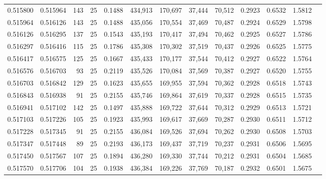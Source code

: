 \begin{tabular}{rrrrrrrrrrrrr}
0.515800 & 0.515964 &   143 &  25 &                                     0.1488 & 434,913 & 170,697 &  37,444 &  70,512 & 0.2923 & 0.6532 & 1.5812 \\
0.515964 & 0.516126 &   143 &  25 &                                     0.1488 & 435,056 & 170,554 &  37,469 &  70,487 & 0.2924 & 0.6529 & 1.5798 \\
0.516126 & 0.516295 &   137 &  25 &                                     0.1543 & 435,193 & 170,417 &  37,494 &  70,462 & 0.2925 & 0.6527 & 1.5786 \\
0.516297 & 0.516416 &   115 &  25 &                                     0.1786 & 435,308 & 170,302 &  37,519 &  70,437 & 0.2926 & 0.6525 & 1.5775 \\
0.516417 & 0.516575 &   125 &  25 &                                     0.1667 & 435,433 & 170,177 &  37,544 &  70,412 & 0.2927 & 0.6522 & 1.5764 \\
0.516576 & 0.516703 &    93 &  25 &                                     0.2119 & 435,526 & 170,084 &  37,569 &  70,387 & 0.2927 & 0.6520 & 1.5755 \\
0.516703 & 0.516842 &   129 &  25 &                                     0.1623 & 435,655 & 169,955 &  37,594 &  70,362 & 0.2928 & 0.6518 & 1.5743 \\
0.516843 & 0.516938 &    91 &  25 &                                     0.2155 & 435,746 & 169,864 &  37,619 &  70,337 & 0.2928 & 0.6515 & 1.5735 \\
0.516941 & 0.517102 &   142 &  25 &                                     0.1497 & 435,888 & 169,722 &  37,644 &  70,312 & 0.2929 & 0.6513 & 1.5721 \\
0.517103 & 0.517226 &   105 &  25 &                                     0.1923 & 435,993 & 169,617 &  37,669 &  70,287 & 0.2930 & 0.6511 & 1.5712 \\
0.517228 & 0.517345 &    91 &  25 &                                     0.2155 & 436,084 & 169,526 &  37,694 &  70,262 & 0.2930 & 0.6508 & 1.5703 \\
0.517347 & 0.517448 &    89 &  25 &                                     0.2193 & 436,173 & 169,437 &  37,719 &  70,237 & 0.2931 & 0.6506 & 1.5695 \\
0.517450 & 0.517567 &   107 &  25 &                                     0.1894 & 436,280 & 169,330 &  37,744 &  70,212 & 0.2931 & 0.6504 & 1.5685 \\
0.517570 & 0.517706 &   104 &  25 &                                     0.1938 & 436,384 & 169,226 &  37,769 &  70,187 & 0.2932 & 0.6501 & 1.5675 \\

\end{tabular}
